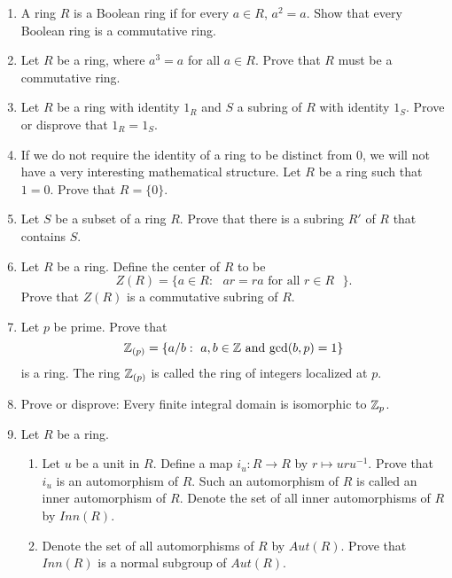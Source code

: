 {\begin{enumerate}
 
\bf\item\rm
A ring $R$ is a {\bfi Boolean
ring\/} if for every $a \in R$,
$a^2 = a$. Show that every Boolean ring is a commutative ring.
 
 
\bf\item\rm
Let $R$ be a ring, where $a^3 =a$ for all $a \in R$. Prove that $R$
must be a commutative ring. 
 
 
\bf\item\rm
Let $R$ be a ring with identity $1_R$ and $S$ a subring of $R$ with
identity $1_S$.  Prove or disprove that $1_R = 1_S$.
 
 
 
\bf\item\rm
If we do not require the identity of a ring to be distinct from 0, we
will not have a very interesting mathematical structure. Let $R$ be a
ring such that $1 = 0$. Prove that $R = \{ 0 \}$. 
 
 
\bf\item\rm
Let $S$ be a subset of a ring $R$.  Prove that there is a subring $R'$
of $R$ that contains $S$. 
 
 
\bf\item\rm
Let $R$ be a ring. Define the {\bfi center\/} of $R$ to be 
\[
Z(R) = \{ a \in R : \mbox{ $ar = ra$ for all $r \in R$ } \}.
\]
Prove that $Z(R)$ is a commutative subring of $R$.
 
 
\bf\item\rm
Let $p$ be prime. Prove that
\[
{\Bbb Z}_{(p)}\label{notelocalint} = \{ a / b :  \mbox{ $a, b \in
{\Bbb Z}$ and $\gcd( b,p) =  1$}  \}  
\]
is a ring.  The ring ${\Bbb Z}_{(p)}$ is called the {\bfi ring of
integers localized at $p$}.  
 
 
\bf\item\rm
Prove or disprove: Every finite integral domain is isomorphic to
${\Bbb Z}_p$. 
 
 
\bf\item\rm
Let $R$ be a ring.
\begin{enumerate}
 
 \bf\item\rm
Let $u$ be a unit in $R$.  Define a map $i_u : R \rightarrow R$ by $r
\mapsto uru^{-1}$. Prove that $i_u$ is an automorphism of $R$. Such an
automorphism of $R$ is called an inner automorphism of $R$. Denote the
set of all inner automorphisms of $R$ by $Inn(R)$.
 
 \bf\item\rm
Denote the set of all automorphisms of $R$ by $Aut(R)$. Prove that
$Inn(R)$ is a normal subgroup of  $Aut(R)$. 
 

\end{enumerate}
\end{enumerate}}
